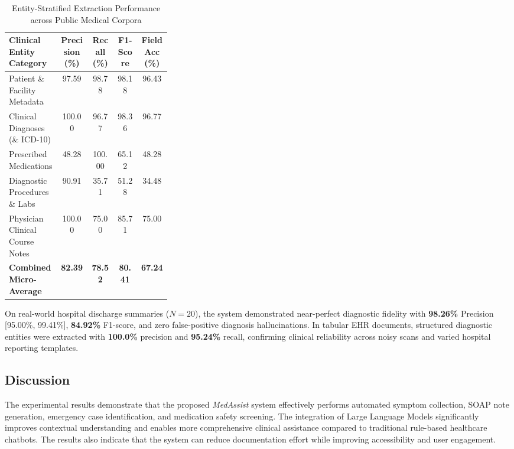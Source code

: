 \documentclass[conference]{IEEEtran}
\begin{document}
\begin{table}[htbp]
\centering
\caption{Entity-Stratified Extraction Performance across Public Medical Corpora}
\label{tab:report_entity_breakdown}
\footnotesize
\setlength{\tabcolsep}{3pt}
\renewcommand{\arraystretch}{1.15}
\begin{tabularx}{\linewidth}{|>{\raggedright\arraybackslash}p{0.32\linewidth}|C|C|C|C|}
\hline
\textbf{Clinical Entity Category} & \textbf{Precision (\%)} & \textbf{Recall (\%)} & \textbf{F1-Score} & \textbf{Field Acc (\%)} \\
\hline
Patient \& Facility Metadata & 97.59 & 98.78 & 98.18 & 96.43 \\
Clinical Diagnoses (\& ICD-10) & 100.00 & 96.77 & 98.36 & 96.77 \\
Prescribed Medications & 48.28 & 100.00 & 65.12 & 48.28 \\
Diagnostic Procedures \& Labs & 90.91 & 35.71 & 51.28 & 34.48 \\
Physician Clinical Course Notes & 100.00 & 75.00 & 85.71 & 75.00 \\
\hline
\textbf{Combined Micro-Average} & \textbf{82.39} & \textbf{78.52} & \textbf{80.41} & \textbf{67.24} \\
\hline
\end{tabularx}
\end{table}

On real-world hospital discharge summaries ($N=20$), the system demonstrated near-perfect diagnostic fidelity with \textbf{98.26\%} Precision [95.00\%, 99.41\%], \textbf{84.92\%} F1-score, and zero false-positive diagnosis hallucinations. In tabular EHR documents, structured diagnostic entities were extracted with \textbf{100.0\%} precision and \textbf{95.24\%} recall, confirming clinical reliability across noisy scans and varied hospital reporting templates.

\subsection{Discussion}

The experimental results demonstrate that the proposed \textit{MedAssist} system effectively performs automated symptom collection, SOAP note generation, emergency case identification, and medication safety screening. The integration of Large Language Models significantly improves contextual understanding and enables more comprehensive clinical assistance compared to traditional rule-based healthcare chatbots. The results also indicate that the system can reduce documentation effort while improving accessibility and user engagement.
\end{document}
